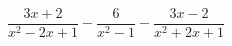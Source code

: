 \begin{ex}[type=expression]
	\begin{condition}
		\(\dfrac{3x+2}{x^2-2x+1}-\dfrac{6}{x^2-1}-\dfrac{3x-2}{x^2+2x+1}\)
	\end{condition}
\end{ex}